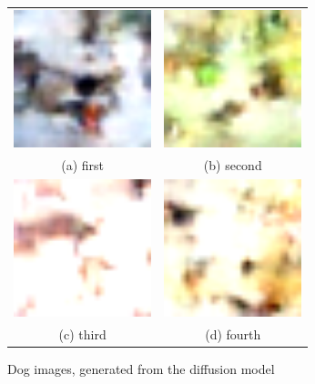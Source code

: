\documentclass[conference]{IEEEtran}
\begin{document}
        \begin{figure}
          \begin{tabular}{cc}
            \includegraphics[width=40mm]{./images/generated-imgs-cosine/dog/0510.png} 
        &   \includegraphics[width=40mm]{./images/generated-imgs-cosine/dog/0511.png} 
        \\
          (a) first 
          & (b) second \\[6pt]
             \includegraphics[width=40mm]{./images/generated-imgs-cosine/dog/0512.png} 
          &  \includegraphics[width=40mm]{./images/generated-imgs-cosine/dog/0513.png} 
        \\
          (c) third & (d) fourth \\[6pt]
          \end{tabular}
          \caption{Dog images, generated from the diffusion model}
          \end{figure}
      
\end{document}
